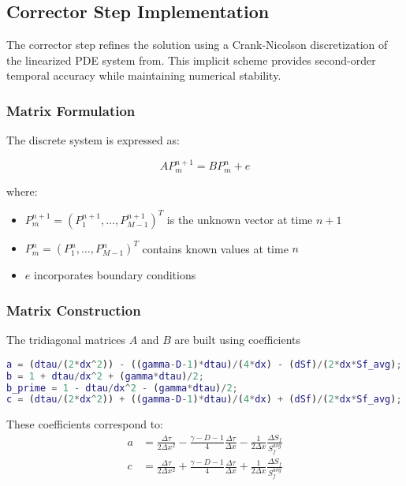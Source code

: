\documentclass[12pt]{article}
\begin{document}
\subsection{Corrector Step Implementation}
\label{subsec:corrector}

The corrector step refines the solution using a Crank-Nicolson discretization of the linearized PDE system from. This implicit scheme provides second-order temporal accuracy while maintaining numerical stability.

\subsubsection{Matrix Formulation}
The discrete system is expressed as:

\begin{equation}
AP_{m}^{n+1} = BP_{m}^{n} + e
\label{eq:matrix_system}
\end{equation}

where:
\begin{itemize}
\item $P_{m}^{n+1} = (P_{1}^{n+1}, \ldots, P_{M-1}^{n+1})^{T}$ is the unknown vector at time $n+1$
\item $P_{m}^{n} = (P_{1}^{n}, \ldots, P_{M-1}^{n})^{T}$ contains known values at time $n$
\item $e$ incorporates boundary conditions
\end{itemize}

\subsubsection{Matrix Construction}
The tridiagonal matrices $A$ and $B$ are built using coefficients
\begin{lstlisting}[language=Matlab,caption={Matrix coefficient computation},label=code:coefficients]
% Spatial and temporal weights
a = (dtau/(2*dx^2)) - ((gamma-D-1)*dtau)/(4*dx) - (dSf)/(2*dx*Sf_avg);
b = 1 + dtau/dx^2 + (gamma*dtau)/2;
b_prime = 1 - dtau/dx^2 - (gamma*dtau)/2;
c = (dtau/(2*dx^2)) + ((gamma-D-1)*dtau)/(4*dx) + (dSf)/(2*dx*Sf_avg);
\end{lstlisting}

These coefficients correspond to:
\begin{align}
a &= \frac{\Delta\tau}{2\Delta x^2} - \frac{\gamma - D - 1}{4}\frac{\Delta\tau}{\Delta x} - \frac{1}{2\Delta x}\frac{\Delta S_f}{S_f^{avg}} \label{eq:coeff_a}\\
c &= \frac{\Delta\tau}{2\Delta x^2} + \frac{\gamma - D - 1}{4}\frac{\Delta\tau}{\Delta x} + \frac{1}{2\Delta x}\frac{\Delta S_f}{S_f^{avg}} \label{eq:coeff_c}
\end{align}
\end{document}
